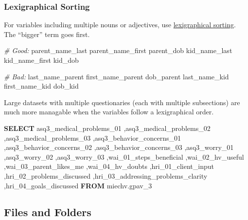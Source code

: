 \documentclass[
]{book}
\newenvironment{Shaded}{\begin{snugshade}}{\end{snugshade}}
\newcommand{\CommentTok}[1]{\textcolor[rgb]{0.56,0.35,0.01}{\textit{#1}}}
\newcommand{\KeywordTok}[1]{\textcolor[rgb]{0.13,0.29,0.53}{\textbf{#1}}}
\newcommand{\NormalTok}[1]{#1}
\begin{document}
\hypertarget{style-naming-variables-lexigraphical}{%
\subsubsection{Lexigraphical Sorting}\label{style-naming-variables-lexigraphical}}

For variables including multiple nouns or adjectives, use \href{https://en.wikipedia.org/wiki/Lexicographical_order}{lexigraphical sorting}. The ``bigger'' term goes first.

\begin{Shaded}
\begin{Highlighting}[]
\CommentTok{\# Good:}
\NormalTok{parent\_name\_last}
\NormalTok{parent\_name\_first}
\NormalTok{parent\_dob}
\NormalTok{kid\_name\_last}
\NormalTok{kid\_name\_first}
\NormalTok{kid\_dob}

\CommentTok{\# Bad:}
\NormalTok{last\_name\_parent}
\NormalTok{first\_name\_parent}
\NormalTok{dob\_parent}
\NormalTok{last\_name\_kid}
\NormalTok{first\_name\_kid}
\NormalTok{dob\_kid}
\end{Highlighting}
\end{Shaded}

Large datasets with multiple questionaries (each with multiple subsections) are much more managable when the variables follow a lexigraphical order.

\begin{Shaded}
\begin{Highlighting}[]
\KeywordTok{SELECT}
\NormalTok{  asq3\_medical\_problems\_01}
\NormalTok{  ,asq3\_medical\_problems\_02}
\NormalTok{  ,asq3\_medical\_problems\_03}
\NormalTok{  ,asq3\_behavior\_concerns\_01}
\NormalTok{  ,asq3\_behavior\_concerns\_02}
\NormalTok{  ,asq3\_behavior\_concerns\_03}
\NormalTok{  ,asq3\_worry\_01}
\NormalTok{  ,asq3\_worry\_02}
\NormalTok{  ,asq3\_worry\_03}
\NormalTok{  ,wai\_01\_steps\_beneficial}
\NormalTok{  ,wai\_02\_hv\_useful}
\NormalTok{  ,wai\_03\_parent\_likes\_me}
\NormalTok{  ,wai\_04\_hv\_doubts}
\NormalTok{  ,hri\_01\_client\_input}
\NormalTok{  ,hri\_02\_problems\_discussed}
\NormalTok{  ,hri\_03\_addressing\_problems\_clarity}
\NormalTok{  ,hri\_04\_goals\_discussed}
\KeywordTok{FROM}\NormalTok{ miechv.gpav\_3}
\end{Highlighting}
\end{Shaded}

\hypertarget{style-naming-files}{%
\subsection{Files and Folders}\label{style-naming-files}}
\end{document}
